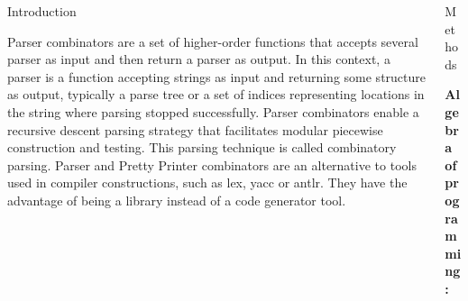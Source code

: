 \documentclass[final]{beamer}
\newlength{\onecolwid}
\newlength{\twocolwid}
\begin{document}
\begin{frame}[t]
\begin{columns}[t]
\begin{column}{\twocolwid} %

\begin{columns}[t,totalwidth=\twocolwid] %

\begin{column}{\onecolwid}\vspace{-.6in} %


\begin{block}{Introduction}

Parser combinators are a set of higher-order functions that accepts several parser as input and then return a parser as output. In this context, a parser is a function accepting strings as input and returning some structure as output, typically a parse tree or a set of indices representing locations in the string where parsing stopped successfully. Parser combinators enable a recursive descent parsing strategy that facilitates modular piecewise construction and testing.
This parsing technique is called combinatory parsing. Parser and Pretty Printer combinators are an alternative to tools used in compiler constructions, such as lex, yacc or antlr. They have the advantage of being a library instead of a code generator tool.

\end{block}


\end{column} %

\begin{column}{\onecolwid}\vspace{-.6in} %


\begin{block}{Methods}

\textbf{Algebra of programming:}


\end{block}
\end{column}
\end{columns}
\end{column}
\end{columns}
\end{frame}
\end{document}

